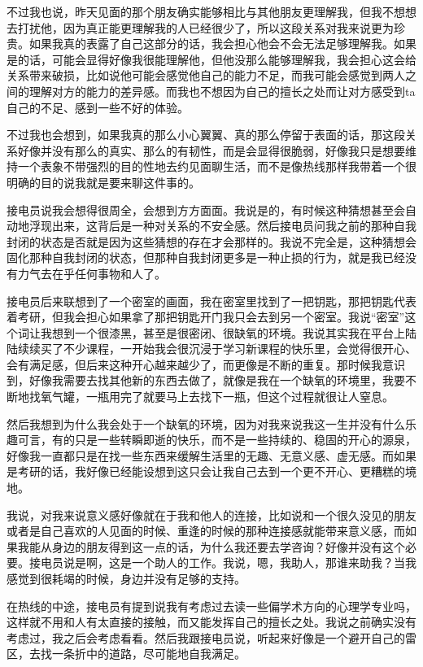 不过我也说，昨天见面的那个朋友确实能够相比与其他朋友更理解我，但我不想想去打扰他，因为真正能更理解我的人已经很少了，所以这段关系对我来说更为珍贵。如果我真的表露了自己这部分的话，我会担心他会不会无法足够理解我。如果是的话，可能会显得好像我很能理解他，但他没那么能够理解我，我会担心这会给关系带来破损，比如说他可能会感觉他自己的能力不足，而我可能会感觉到两人之间的理解对方的能力的差异感。而我也不想因为自己的擅长之处而让对方感受到ta自己的不足、感到一些不好的体验。

不过我也会想到，如果我真的那么小心翼翼、真的那么停留于表面的话，那这段关系好像并没有那么的真实、那么的有韧性，而是会显得很脆弱，好像我只是想要维持一个表象\pozhehao{}不带强烈的目的性地去约见面聊生活，而不是像热线那样我带着一个很明确的目的说我就是要来聊这件事的。

接电员说我会想得很周全，会想到方方面面。我说是的，有时候这种猜想甚至会自动地浮现出来，这背后是一种对关系的不安全感。然后接电员问我之前的那种自我封闭的状态是否就是因为这些猜想的存在才会那样的。我说不完全是，这种猜想会固化那种自我封闭的状态，但那种自我封闭更多是一种止损的行为，就是我已经没有力气去在乎任何事物和人了。

接电员后来联想到了一个密室的画面，我在密室里找到了一把钥匙，那把钥匙代表着考研，但我会担心如果拿了那把钥匙开门我只会去到另一个密室。我说“密室”这个词让我想到一个很漆黑，甚至是很密闭、很缺氧的环境。我说其实我在平台上陆陆续续买了不少课程，一开始我会很沉浸于学习新课程的快乐里，会觉得很开心、会有满足感，但后来这种开心越来越少了，而更像是不断的重复。那时候我意识到，好像我需要去找其他新的东西去做了，就像是我在一个缺氧的环境里，我要不断地找氧气罐，一瓶用完了就要马上去找下一瓶，但这个过程就很让人窒息。

然后我想到为什么我会处于一个缺氧的环境，因为对我来说我这一生并没有什么乐趣可言，有的只是一些转瞬即逝的快乐，而不是一些持续的、稳固的开心的源泉，好像我一直都只是在找一些东西来缓解生活里的无趣、无意义感、虚无感。而如果是考研的话，我好像已经能设想到这只会让我自己去到一个更不开心、更糟糕的境地。

我说，对我来说意义感好像就在于我和他人的连接，比如说和一个很久没见的朋友或者是自己喜欢的人见面的时候、重逢的时候的那种连接感就能带来意义感，而如果我能从身边的朋友得到这一点的话，为什么我还要去学咨询？好像并没有这个必要。接电员说是啊，这是一个助人的工作。我说，嗯，我助人，那谁来助我？当我感觉到很耗竭的时候，身边并没有足够的支持。

在热线的中途，接电员有提到说我有考虑过去读一些偏学术方向的心理学专业吗，这样就不用和人有太直接的接触，而又能发挥自己的擅长之处。我说之前确实没有考虑过，我之后会考虑看看。然后我跟接电员说，听起来好像是一个避开自己的雷区，去找一条折中的道路，尽可能地自我满足。

